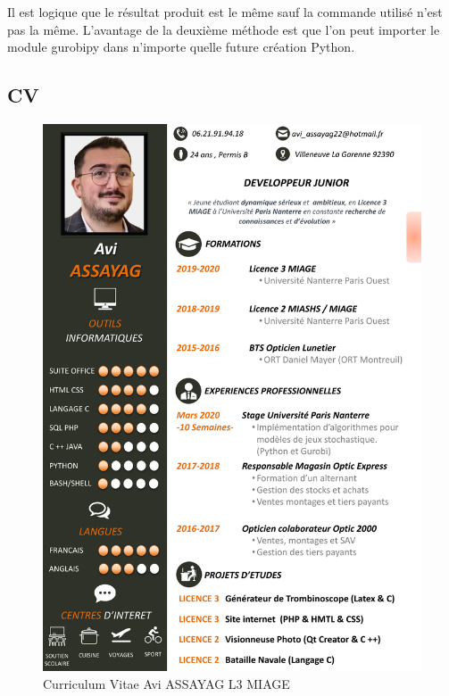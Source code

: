 \documentclass[a4paper, 12pt, twoside]{article}
\begin{document}
Il est logique que le résultat produit est le même sauf la commande utilisé n'est pas la même. L'avantage de la deuxième méthode est que l'on peut importer le module \textsf{gurobipy} dans n'importe quelle future création Python.
\newpage
\subsection{ CV}
\begin{center}
\begin{figure}[h!]
\centering
\includegraphics [scale=0.83]{CV.pdf}
\caption{Curriculum Vitae Avi ASSAYAG L3 MIAGE}
\end{figure}
\end{center}
\listoffigures\
\end{document}
